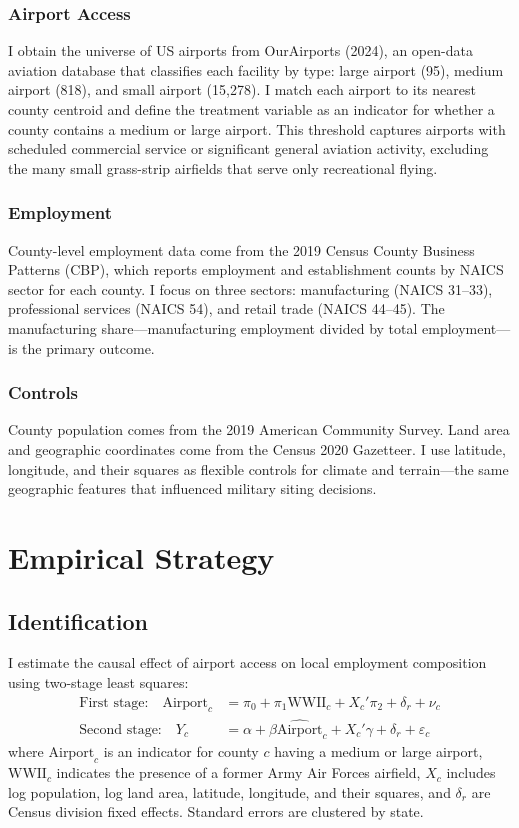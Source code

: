 \documentclass[12pt]{article}
\begin{document}
\subsubsection*{Airport Access} I obtain the universe of US airports from OurAirports (2024), an open-data aviation database that classifies each facility by type: large airport (95), medium airport (818), and small airport (15,278). I match each airport to its nearest county centroid and define the treatment variable as an indicator for whether a county contains a medium or large airport. This threshold captures airports with scheduled commercial service or significant general aviation activity, excluding the many small grass-strip airfields that serve only recreational flying.

\subsubsection*{Employment} County-level employment data come from the 2019 Census County Business Patterns (CBP), which reports employment and establishment counts by NAICS sector for each county. I focus on three sectors: manufacturing (NAICS 31--33), professional services (NAICS 54), and retail trade (NAICS 44--45). The manufacturing share---manufacturing employment divided by total employment---is the primary outcome.

\subsubsection*{Controls} County population comes from the 2019 American Community Survey. Land area and geographic coordinates come from the Census 2020 Gazetteer. I use latitude, longitude, and their squares as flexible controls for climate and terrain---the same geographic features that influenced military siting decisions.



\section{Empirical Strategy}

\subsection{Identification}

I estimate the causal effect of airport access on local employment composition using two-stage least squares:
\begin{align}
\text{First stage:} \quad \text{Airport}_{c} &= \pi_0 + \pi_1 \text{WWII}_{c} + X_c'\pi_2 + \delta_r + \nu_c \label{eq:fs} \\
\text{Second stage:} \quad Y_{c} &= \alpha + \beta \widehat{\text{Airport}}_{c} + X_c'\gamma + \delta_r + \varepsilon_c \label{eq:ss}
\end{align}
where $\text{Airport}_c$ is an indicator for county $c$ having a medium or large airport, $\text{WWII}_c$ indicates the presence of a former Army Air Forces airfield, $X_c$ includes log population, log land area, latitude, longitude, and their squares, and $\delta_r$ are Census division fixed effects. Standard errors are clustered by state.
\end{document}
